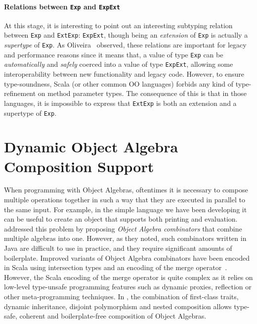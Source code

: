 \paragraph{Relations between \lstinline{Exp} and \lstinline{ExpExt}}
At this stage, it is interesting to point out an interesting subtyping relation
between \lstinline{Exp} and \lstinline{ExtExp}: \lstinline{ExpExt}, though being an
\emph{extension} of \lstinline{Exp} is actually a \emph{supertype} of \lstinline{Exp}.
As Oliveira~\citep{oliveira09modular} observed, these relations are
important for legacy and performance reasons since it means that, a value of
type \lstinline{Exp} can be \emph{automatically} and \emph{safely}
coerced into a value of type \lstinline{ExpExt}, allowing some
interoperability between new functionality and legacy code.
However, to ensure type-soundness, Scala (or other common OO languages) forbids any kind of type-refinement on method
parameter types. The consequence of this is that in those languages, it is
impossible to express that \lstinline{ExtExp} is both an extension and a
supertype of \lstinline{Exp}.




\section{Dynamic Object Algebra Composition Support}

When programming with Object Algebras, oftentimes it is necessary to compose
multiple operations together in such a way that they are executed in parallel to
the same input. For example, in the simple language we have been developing it
can be useful to create an object that supports both printing and evaluation.
\citet{oliveira2012extensibility} addressed this problem by
proposing \emph{Object Algebra combinators} that combine multiple algebras into
one. However, as they noted, such combinators written in Java are difficult to
use in practice, and they require significant amounts of boilerplate. Improved
variants of Object Algebra combinators have been encoded in Scala using
intersection types and an encoding of the merge
operator~\citep{oliveira2013feature, rendel14attributes}. However, the Scala
encoding of the merge operator is quite complex as it relies on low-level
type-unsafe programming features such as dynamic proxies, reflection or other
meta-programming techniques. In \sedel, the combination of first-class traits,
dynamic inheritance, disjoint polymorphism and nested composition allows type-safe, coherent and
boilerplate-free composition of Object Algebras.

